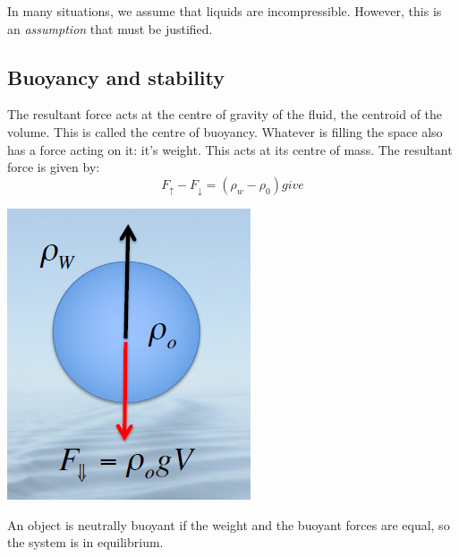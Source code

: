 \documentclass[class=report, crop=false, 12pt,a4paper]{standalone}
\begin{document}
In many situations, we assume  that liquids are incompressible. However, this is an \emph{assumption} that must be justified. 

\subsection{Buoyancy and stability}
The resultant force acts at the centre of gravity of the fluid, the centroid of the volume. This is called the centre of buoyancy. Whatever is filling the space also has a force acting on it: it's weight. This acts at its centre of mass. The resultant force is given by: 
\begin{equation}
  F_\uparrow - F_\downarrow = (\rho_w - \rho_0) give
\end{equation}
\begin{center}
  \includegraphics[width = 0.4 \textwidth]{../img/BuoyancyForces}
\end{center}
An object is neutrally buoyant if the weight and the buoyant forces are equal, so the system is in equilibrium. 
\end{document}
